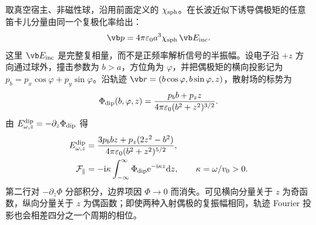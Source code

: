 取真空宿主、非磁性球，沿用前面定义的 $\chi_{\rm sph}$。在长波近似下诱导偶极矩的任意笛卡儿分量由同一个复极化率给出：
\begin{equation}
\vb p=4\pi\varepsilon_0a^3\chi_{\rm sph}\,\vb E_{\rm inc}.
\label{eq:sphere-dipole-worked}
\end{equation}
这里 $\vb E_{\rm inc}$ 是完整复相量，而不是正频率解析信号的半振幅。设电子沿 $+z$ 方向通过球外，撞击参数为 $b>a$，方位角为 $\varphi$，并把偶极矩的横向投影记为 $p_b=p_x\cos\varphi+p_y\sin\varphi$。沿轨迹 $\vb r=(b\cos\varphi,b\sin\varphi,z)$，散射场的标势为
\begin{equation}
\Phi_{\rm dip}(b,\varphi,z)
=\frac{p_b b+p_z z}{4\pi\varepsilon_0(b^2+z^2)^{3/2}}.
\label{eq:dipole-general-potential}
\end{equation}
由 $E_{\omega,z}^{\rm dip}=-\partial_z\Phi_{\rm dip}$ 得
\begin{align}
E_{\omega,z}^{\rm dip}
&=\frac{3p_b b z+p_z(2z^2-b^2)}
{4\pi\varepsilon_0(b^2+z^2)^{5/2}},
\label{eq:dipole-trajectory-field}\\
\mathcal F_\parallel
&=-\mathrm{i}\kappa\int_{-\infty}^{\infty}\Phi_{\rm dip}
\mathrm{e}^{-\mathrm{i}\kappa z}\mathrm{d} z,\qquad \kappa=\omega/v_0>0.
\end{align}
第二行对 $-\partial_z\Phi$ 分部积分，边界项因 $\Phi\to0$ 而消失。可见横向分量关于 $z$ 为奇函数，纵向分量关于 $z$ 为偶函数；即使两种入射偶极的复振幅相同，轨迹 Fourier 投影也会相差四分之一个周期的相位。

